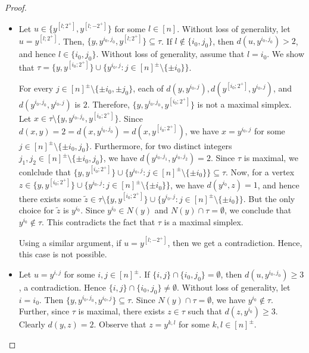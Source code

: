 \documentclass{amsart}
\theoremstyle{definition}
\theoremstyle{remark}
\numberwithin{equation}{section}
\begin{document}
\begin{proof}
\begin{itemize}
		\vspace{.25cm}
		
		\begin{itemize}
			\item[(1.a)] Let $u \in \{y^{[l; 2^+]}, y^{[l; -2^+]}\}$ for some $l \in [n]$. Without loss of generality, let  $u = y^{[l; 2^+]}$.  Then,  $\{y, y^{i_0, j_0}, y^{[l; 2^+]}\} \subseteq \tau$. If $l \notin \{i_0, j_0\}$, then $d(u, y^{i_0, j_0}) > 2$, and hence $l \in \{i_0, j_0\}$.  Without loss of generality, assume that $l = i_0$.  We show that $\tau =  \{y, y^{[i_0; 2^+]}\} \cup  \{y^{i_0, j} : j \in [n]^{\pm} \setminus \{\pm i_0\}\}$.  
            
            For every $j \in  [n]^{\pm} \setminus \{\pm i_0,\pm j_0\}$, each of $d(y, y^{i_0, j}), d(y^{[i_0; 2^+]}, y^{i_0, j} )$,  and $d(y^{i_0, j_0}, y^{i_0, j})$ is $2$. Therefore,  $\{y, y^{i_0, j_0}, y^{[i_0; 2^+]}\}$ is not a maximal simplex. Let $x \in \tau\setminus \{y, y^{i_0, j_0}, y^{[i_0; 2^+]}\} $. Since  $d(x, y) =  2=  d(x, y^{i_0, j_0} ) = d(x, y^{[i_0; 2^+]})$, we have $x = y^{i_0, j}$ for some  $j \in  [n]^{\pm} \setminus \{\pm i_0, j_0\}$. Furthermore, for two distinct integers $j_1, j_2 \in [n]^{\pm} \setminus \{\pm i_0, j_0\}$, we have $d(y^{i_0, j_1}, y^{i_0, j_2}) = 2$. Since $\tau$ is maximal,  we conlclude that $\{y, y^{[i_0; 2^+]}\} \cup  \{y^{i_0, j} : j \in [n]^{\pm} \setminus \{\pm i_0\}\} \subseteq \tau $. Now, for a vertex $z \in \{y , y^{[i_0; 2^+]}\} \cup  \{y^{i_0, j} : j \in [n]^{\pm} \setminus \{\pm i_0\}\} $, we have $d(y^{i_0}, z) = 1$, and hence there exists some $\tilde{z} \in \tau \setminus\{y,y^{[i_0; 2^+]}\} \cup  \{y^{i_0, j} : j \in [n]^{\pm} \setminus \{\pm i_0\}\}$. But the only choice for  $\tilde{z}$ is $y^{i_0}$. Since  $y^{i_0} \in N(y)$ and $N(y) \cap \tau = \emptyset$, we conclude that $y^{i_0} \notin \tau$. 
			This contradicts the fact that $\tau$ is a maximal simplex.
			
			
			Using a similar argument, if $u= y^{[l; -2^+]}$, then we get a contradiction.  Hence, this case is not possible.
			\item[(1.b)] Let $u= y^{i, j}$ for some  $ i, j \in [n]^{\pm}$.  If $\{i, j\} \cap \{i_0, j_0\} = \emptyset $, then $d(u, y^{i_0, j_0}) \geq 3$, a contradiction. Hence $\{i, j\} \cap \{i_0, j_0\} \neq \emptyset$. Without loss of generality, let $i = i_0$. Then $\{y, y^{i_0, j_0}, y^{i_0, j}\} \subseteq \tau.$  Since $N(y) \cap \tau = \emptyset$, we have $y^{i_0} \notin \tau$. Further, since $\tau$ is maximal, there exists  $z \in \tau$ such that $d(z, y^{i_0}) \geq 3$. Clearly $d(y, z) = 2$. Observe that   $z = y^{k,l}$ for some $k, l \in [n]^{\pm}$. 
			

\end{itemize}
\end{itemize}
\end{proof}
\end{document}
